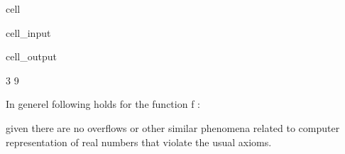 \documentclass[a4paper,10pt,english]{jupyterBook}
\begin{document}
\begin{sphinxuseclass}{cell}\begin{sphinxVerbatimInput}

\begin{sphinxuseclass}{cell_input}
\begin{sphinxVerbatim}[commandchars=\\\{\}]
\end{sphinxVerbatim}

\end{sphinxuseclass}\end{sphinxVerbatimInput}
\begin{sphinxVerbatimOutput}

\begin{sphinxuseclass}{cell_output}
\begin{sphinxVerbatim}[commandchars=\\\{\}]
3
9
\end{sphinxVerbatim}

\end{sphinxuseclass}\end{sphinxVerbatimOutput}

\end{sphinxuseclass}
\sphinxAtStartPar
In generel following holds for the function f :

\begin{sphinxVerbatim}[commandchars=\\\{\}]
\end{sphinxVerbatim}

\sphinxAtStartPar
given there are no overflows or other similar phenomena related to computer representation of real numbers that violate the usual axioms.
\end{document}
